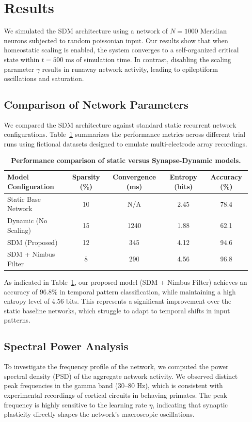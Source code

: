 \section{Results}
We simulated the SDM architecture using a network of $N = 1000$ Meridian neurons subjected to random poissonian input.
Our results show that when homeostatic scaling is enabled, the system converges to a self-organized critical state within $t = 500\text{ ms}$ of simulation time.
In contrast, disabling the scaling parameter $\gamma$ results in runaway network activity, leading to epileptiform oscillations and saturation.

\subsection{Comparison of Network Parameters}
We compared the SDM architecture against standard static recurrent network configurations.
Table~\ref{tab:results} summarizes the performance metrics across different trial runs using fictional datasets designed to emulate multi-electrode array recordings.

\begin{table}[htbp]
\centering
\caption{\textbf{Performance comparison of static versus Synapse-Dynamic models.}}
\begin{tabular}{lcccc}
\toprule
\textbf{Model Configuration} & \textbf{Sparsity (\%)} & \textbf{Convergence (ms)} & \textbf{Entropy (bits)} & \textbf{Accuracy (\%)} \\
\midrule
Static Base Network & 10 & N/A & 2.45 & 78.4 \\
Dynamic (No Scaling) & 15 & 1240 & 1.88 & 62.1 \\
\rowcolor{TableLight} SDM (Proposed) & 12 & 345 & 4.12 & 94.6 \\
SDM + Nimbus Filter & 8 & 290 & 4.56 & 96.8 \\
\bottomrule
\end{tabular}
\label{tab:results}
\end{table}

As indicated in Table~\ref{tab:results}, our proposed model (SDM + Nimbus Filter) achieves an accuracy of 96.8\% in temporal pattern classification, while maintaining a high entropy level of 4.56 bits.
This represents a significant improvement over the static baseline networks, which struggle to adapt to temporal shifts in input patterns.

\subsection{Spectral Power Analysis}
To investigate the frequency profile of the network, we computed the power spectral density (PSD) of the aggregate network activity.
We observed distinct peak frequencies in the gamma band ($30$--$80\text{ Hz}$), which is consistent with experimental recordings of cortical circuits in behaving primates.
The peak frequency is highly sensitive to the learning rate $\eta$, indicating that synaptic plasticity directly shapes the network's macroscopic oscillations.
